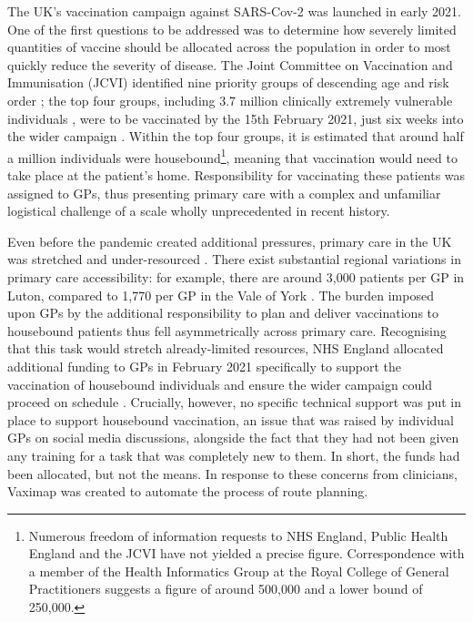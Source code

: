\documentclass{article}
\begin{document}
The UK’s vaccination campaign against SARS-Cov-2 was launched in early 2021. One of the first questions to be addressed was to determine how severely limited quantities of vaccine should be allocated across the population in order to most quickly reduce the severity of disease. The Joint Committee on Vaccination and Immunisation (JCVI) identified nine priority groups of descending age and risk order \cite{JCVI2020}; the top four groups, including 3.7 million clinically extremely vulnerable individuals \cite{ONS_CEV}, were to be vaccinated by the 15th February 2021, just six weeks into the wider campaign \cite{NHSE_uplift}. Within the top four groups, it is estimated that around half a million individuals were housebound\footnote{Numerous freedom of information requests to NHS England, Public Health England and the JCVI have not yielded a precise figure. Correspondence with a member of the Health Informatics Group at the Royal College of General Practitioners suggests a figure of around 500,000 and a lower bound of 250,000.}, meaning that vaccination would need to take place at the patient’s home. Responsibility for vaccinating these patients was assigned to GPs, thus presenting primary care with a complex and unfamiliar logistical challenge of a scale wholly unprecedented in recent history. 

Even before the pandemic created additional pressures, primary care in the UK was stretched and under-resourced \cite{TheKingsFund2020, BritishMedicalAssociation2022}. There exist substantial regional variations in primary care accessibility: for example, there are around 3,000 patients per GP in Luton, compared to 1,770 per GP in the Vale of York \cite{Rolewicz2021}. The burden imposed upon GPs by the additional responsibility to plan and deliver vaccinations to housebound patients thus fell asymmetrically across primary care. Recognising that this task would stretch already-limited resources, NHS England allocated additional funding to GPs in February 2021 specifically to support the vaccination of housebound individuals and ensure the wider campaign could proceed on schedule \cite{NHSE_uplift}. Crucially, however, no specific technical support was put in place to support housebound vaccination, an issue that was raised by individual GPs on social media discussions, alongside the fact that they had not been given any training for a task that was completely new to them. In short, the funds had been allocated, but not the means. In response to these concerns from clinicians, Vaximap was created to automate the process of route planning.
\end{document}
